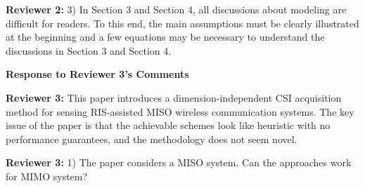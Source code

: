 \documentclass[a4paper,12pt]{article}
\newcommand{\blue}[1]{{\color{blue}{#1}}}
\begin{document}
\blue{
    {\bf Authors:} 
}


\textbf{Reviewer 2:}
3) In Section 3 and Section 4, all discussions about modeling are difficult for readers. To this end, the main assumptions must be clearly illustrated at the beginning and a few equations may be necessary to understand the discussions in Section 3 and Section 4.

\blue{
    {\bf Authors:} 
}



{}

\clearpage 



\begin{center}
    {\Large\bf Response to Reviewer 3's Comments}
\end{center}

\textbf{Reviewer 3:}
This paper introduces a dimension-independent CSI acquisition method for sensing
RIS-assisted MISO wireless communication systems. The key issue of the paper is that the achievable schemes look like heuristic with no performance guarantees, and the methodology does not seem novel.

{}

\textbf{Reviewer 3:}
1) The paper considers a MISO system. Can the approaches work for MIMO system?
\end{document}
